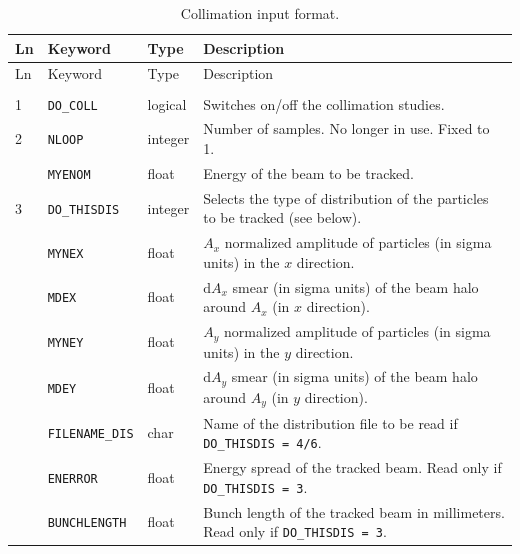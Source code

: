 \bigskip
\begin{center}
\begin{longtable}{| p{0.5cm} | p{2.4cm} | p{1.2cm} | >{\raggedright\arraybackslash}p{11.4cm}|}
    \caption{Collimation input format.}
    \label{tab:COLL_INP} \\*
    \hline
    \rowcolor{blue!30}
    Ln & Keyword & Type & Description \\*
    \hline
    \endfirsthead

    \hline
    \rowcolor{blue!30}
    Ln & Keyword & Type & Description \\*
    \hline
    \endhead

    \rowcolor{gray!15}
    \multicolumn{4}{|c|}{(The table continues on the next page)}\\*
    \hline
    \endfoot

    \hline
    \endlastfoot

    1   & \texttt{DO\_COLL}      & logical & Switches on/off the collimation studies. \\
    \hline

    2   & \texttt{NLOOP}         & integer & Number of samples. No longer in use. Fixed to 1. \\
        \cline{2-4}
        & \texttt{MYENOM}        & float   & Energy of the beam to be tracked. \\
    \hline

    3   & \texttt{DO\_THISDIS}   & integer & Selects the type of distribution of the particles to be tracked (see below). \\
        \cline{2-4}
        & \texttt{MYNEX}         & float   & $A_x$ normalized amplitude of particles (in sigma units) in the $x$ direction. \\
        \cline{2-4}
        & \texttt{MDEX}          & float   & $\mbox{d}A_x$ smear (in sigma units) of the beam halo around $A_x$ (in $x$ direction). \\
        \cline{2-4}
        & \texttt{MYNEY}         & float   & $A_y$ normalized amplitude of particles (in sigma units) in the $y$ direction. \\
        \cline{2-4}
        & \texttt{MDEY}          & float   & $\mbox{d}A_y$ smear (in sigma units) of the beam halo around $A_y$ (in $y$ direction). \\
        \cline{2-4}
        & \texttt{FILENAME\_DIS} & char    & Name of the distribution file to be read if \texttt{DO\_THISDIS = 4/6}. \\
        \cline{2-4}
        & \texttt{ENERROR}       & float   & Energy spread of the tracked beam. Read only if \texttt{DO\_THISDIS = 3}. \\
        \cline{2-4}
        & \texttt{BUNCHLENGTH}   & float   & Bunch length of the tracked beam in millimeters. Read only if \texttt{DO\_THISDIS = 3}. \\
    \hline


\end{longtable}
\end{center}
